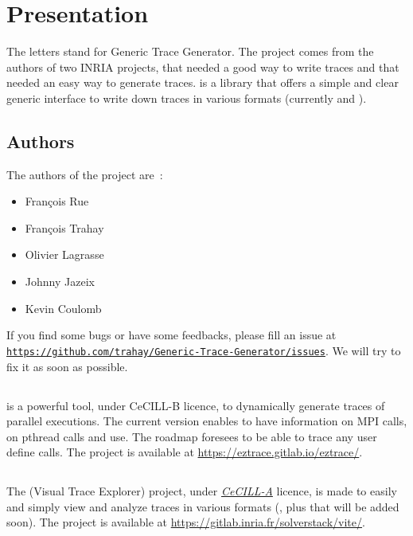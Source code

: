 \section{Presentation}
The \GTG{} letters stand for Generic Trace Generator. The project comes from the 
authors of two INRIA projects, \eztrace{} that needed a good way to 
write traces and \ViTE{} that needed an easy way to generate traces. \GTG{}
is a library that offers a simple and clear generic interface to write down
traces in various formats (currently \paje{} and \OTF).

\subsection{Authors}
The authors of the project are~:
\begin{itemize}
\item Fran\c cois Rue
\item Fran\c cois Trahay
\item Olivier Lagrasse
\item Johnny Jazeix
\item Kevin Coulomb
\end{itemize}

If you find some bugs or have some feedbacks, please fill an issue at \href{https://github.com/trahay/Generic-Trace-Generator/issues}{\nolinkurl{https://github.com/trahay/Generic-Trace-Generator/issues}}. We will try to fix it as soon as possible.

\subsection{\eztrace}
\eztrace{} is a powerful tool, under CeCILL-B licence, to dynamically
generate traces of parallel executions. The current version enables to have
information on MPI calls, on pthread calls and use. The roadmap foresees to
be able to trace any user define calls. The project is available at 
\url{https://eztrace.gitlab.io/eztrace/}.

\subsection{\ViTE{}}
The \ViTE{} (Visual Trace Explorer) project, under \href{http://www.cecill.info/licences/Licence_CeCILL_V2-en.html}{\textit{CeCILL-A}} licence, is made to easily and simply view and 
analyze traces in various formats (\paje{}, \OTF{} plus \TAU{} that will be added 
soon). The project is available at \url{https://gitlab.inria.fr/solverstack/vite/}.


